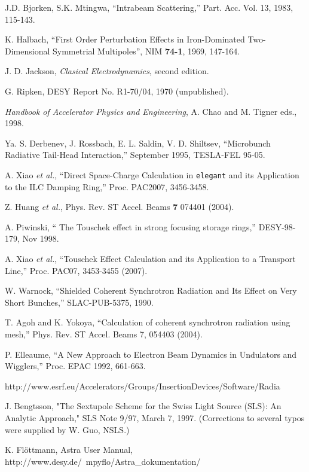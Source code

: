 \documentclass[11pt]{article}
\begin{document}
\begin{thebibliography}{99}
  J.D. Bjorken, S.K. Mtingwa, ``Intrabeam Scattering,'' Part. Acc. Vol. 13, 
  1983, 115-143.

    K. Halbach, ``First Order Perturbation Effects in Iron-Dominated Two-Dimensional Symmetrial Multipoles'',
    NIM {\bf 74-1}, 1969, 147-164.

  J. D. Jackson, {\em Clasical Electrodynamics}, second edition.

 G. Ripken, DESY Report No. R1-70/04, 1970 (unpublished).

  {\em Handbook of Accelerator Physics and Engineering}, A. Chao and M. Tigner eds., 1998.

  Ya. S. Derbenev, J. Rossbach, E. L. Saldin, V. D. Shiltsev, ``Microbunch Radiative Tail-Head
  Interaction,'' September 1995, TESLA-FEL 95-05.

  A. Xiao {\em et al.}, ``Direct Space-Charge Calculation in {\tt elegant} and its Application to the
 ILC Damping Ring,'' Proc. PAC2007, 3456-3458.

  Z. Huang {\em et al.}, Phys. Rev. ST Accel. Beams {\bf 7} 074401 (2004).

  A. Piwinski, `` The Touschek effect in strong focusing storage rings,'' DESY-98-179, Nov 1998.

  A. Xiao {\em et al.}, ``Touschek Effect Calculation and its Application to a Transport Line,''
  Proc. PAC07, 3453-3455 (2007).

  W. Warnock, ``Shielded Coherent Synchrotron Radiation and Its Effect on Very Short Bunches,'' SLAC-PUB-5375, 1990.

  T. Agoh and K. Yokoya, ``Calculation of coherent synchrotron radiation using mesh,'' Phys. Rev. ST Accel. Beams 7,
  054403 (2004).

  P. Elleaume, ``A New Approach to Electron Beam Dynamics in Undulators and Wigglers,'' Proc. EPAC 1992, 661-663.

  http://www.esrf.eu/Accelerators/Groups/InsertionDevices/Software/Radia

 J. Bengtsson, "The Sextupole Scheme for the Swiss Light Source (SLS): An Analytic Approach," SLS Note 9/97,
 March 7, 1997. (Corrections to several typos were supplied by W. Guo, NSLS.)

  K. Fl\"{o}ttmann, Astra User Manual, http://www.desy.de/~mpyflo/Astra\_dokumentation/


\end{thebibliography}
\end{document}

